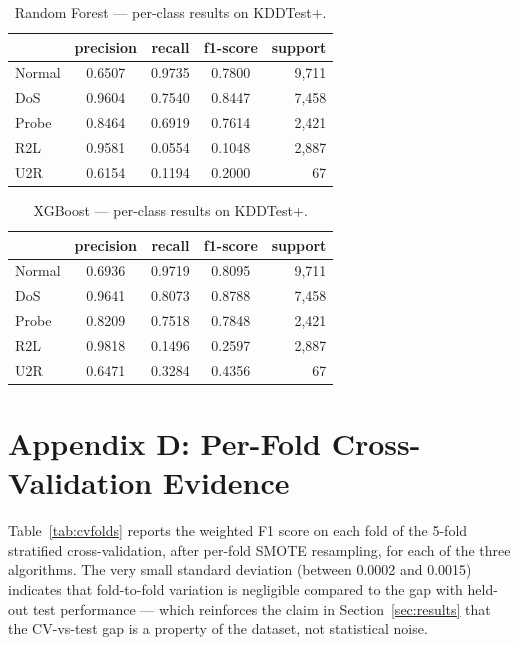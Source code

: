 \documentclass[11pt, a4paper]{article}
\begin{document}
\begin{table}[H]
\centering
\caption{Random Forest --- per-class results on KDDTest+.}
\begin{tabular}{lcccr}
\toprule
        & precision & recall & f1-score & support \\
\midrule
Normal  & 0.6507 & 0.9735 & 0.7800 & 9{,}711 \\
DoS     & 0.9604 & 0.7540 & 0.8447 & 7{,}458 \\
Probe   & 0.8464 & 0.6919 & 0.7614 & 2{,}421 \\
R2L     & 0.9581 & 0.0554 & 0.1048 & 2{,}887 \\
U2R     & 0.6154 & 0.1194 & 0.2000 &      67 \\
\bottomrule
\end{tabular}
\end{table}

\begin{table}[H]
\centering
\caption{XGBoost --- per-class results on KDDTest+.}
\begin{tabular}{lcccr}
\toprule
        & precision & recall & f1-score & support \\
\midrule
Normal  & 0.6936 & 0.9719 & 0.8095 & 9{,}711 \\
DoS     & 0.9641 & 0.8073 & 0.8788 & 7{,}458 \\
Probe   & 0.8209 & 0.7518 & 0.7848 & 2{,}421 \\
R2L     & 0.9818 & 0.1496 & 0.2597 & 2{,}887 \\
U2R     & 0.6471 & 0.3284 & 0.4356 &      67 \\
\bottomrule
\end{tabular}
\end{table}

\section*{Appendix D: Per-Fold Cross-Validation Evidence}

Table~\ref{tab:cvfolds} reports the weighted F1 score on each fold of the 5-fold stratified cross-validation, after per-fold SMOTE resampling, for each of the three algorithms. The very small standard deviation (between 0.0002 and 0.0015) indicates that fold-to-fold variation is negligible compared to the gap with held-out test performance --- which reinforces the claim in Section~\ref{sec:results} that the CV-vs-test gap is a property of the dataset, not statistical noise.
\end{document}
